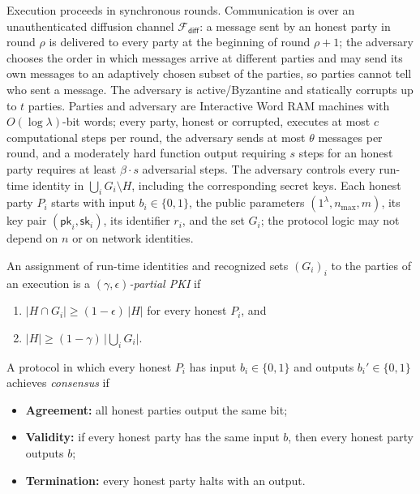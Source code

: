 \documentclass{aicr-conjecture}
\newcommand{\pk}{\mathsf{pk}}
\newcommand{\sk}{\mathsf{sk}}
\newcommand{\Fdiff}{\mathcal{F}_{\mathsf{diff}}}
\begin{document}
\begin{definition}\label{def:exec}
Execution proceeds in synchronous rounds. Communication is over an
unauthenticated diffusion channel $\Fdiff$: a message sent by an honest
party in round $\rho$ is delivered to every party at the beginning of
round $\rho+1$; the adversary chooses the order in which messages arrive
at different parties and may send its own messages to an adaptively
chosen subset of the parties, so parties cannot tell who sent a message.
The adversary is active/Byzantine and statically corrupts up to $t$
parties. Parties and adversary are Interactive Word RAM machines with
$O(\log\lambda)$-bit words; every party, honest or corrupted, executes
at most $c$ computational steps per round, the adversary sends at most
$\theta$ messages per round, and a moderately hard function output
requiring $s$ steps for an honest party requires at least
$\beta \cdot s$ adversarial steps. The adversary controls every
run-time identity in
$\bigcup_i G_i \setminus H$, including the corresponding secret keys.
Each honest party $P_i$ starts with input $b_i \in \{0,1\}$, the public
parameters $(1^{\lambda}, n_{\max}, m)$, its key pair $(\pk_i, \sk_i)$,
its identifier $r_i$, and the set $G_i$; the protocol logic may not
depend on $n$ or on network identities.
\end{definition}

\begin{definition}\label{def:ppki}
An assignment of run-time identities and recognized sets $(G_i)_i$ to
the parties of an execution is a \emph{$(\gamma,\epsilon)$-partial PKI}
if
\begin{enumerate}
\item $|H \cap G_i| \ge (1-\epsilon)\,|H|$ for every honest $P_i$, and
\item $|H| \ge (1-\gamma)\,\big|\bigcup_i G_i\big|$.
\end{enumerate}
\end{definition}

\begin{definition}[Consensus]\label{def:consensus}
A protocol in which every honest $P_i$ has input $b_i \in \{0,1\}$ and
outputs $b_i' \in \{0,1\}$ achieves \emph{consensus} if
\begin{itemize}
\item \textbf{Agreement:} all honest parties output the same bit;
\item \textbf{Validity:} if every honest party has the same input $b$,
  then every honest party outputs $b$;
\item \textbf{Termination:} every honest party halts with an output.
\end{itemize}
\end{definition}
\end{document}
